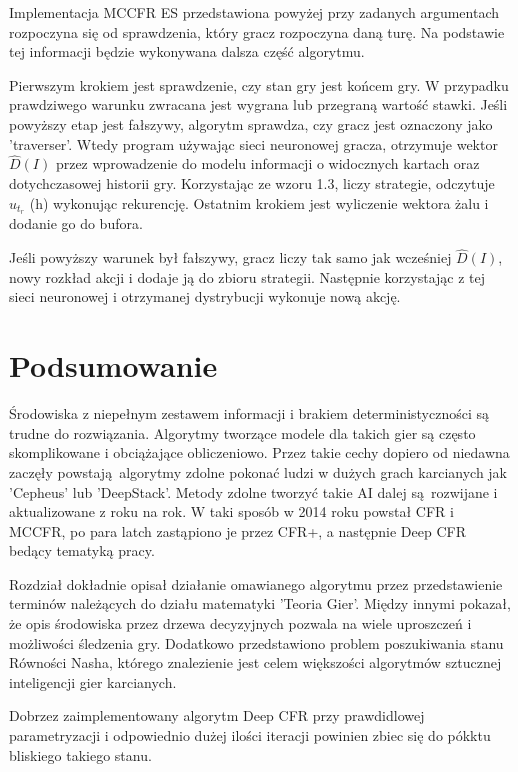 \documentclass[12pt,oneside,a4paper]{report}
\begin{document}
\vspace{1cm}

Implementacja MCCFR ES przedstawiona powyżej przy zadanych argumentach rozpoczyna się od
sprawdzenia, który gracz rozpoczyna daną turę. Na podstawie tej informacji będzie wykonywana
dalsza część algorytmu.


Pierwszym krokiem jest sprawdzenie, czy stan gry jest końcem gry. W przypadku prawdziwego 
warunku zwracana jest wygrana lub przegraną wartość stawki. 
Jeśli powyższy etap jest fałszywy, algorytm sprawdza, czy gracz jest oznaczony jako 'traverser'.
Wtedy program używając sieci neuronowej gracza,
otrzymuje wektor $\hat{D}(I)$ przez wprowadzenie do modelu informacji o widocznych kartach oraz
dotychczasowej historii gry. Korzystając ze wzoru 1.3, liczy strategie, odczytuje $u_{t_{r}}$ (h) 
wykonując rekurencję. Ostatnim krokiem jest wyliczenie wektora żalu i dodanie go do bufora.

Jeśli powyższy warunek był fałszywy, gracz liczy tak samo jak wcześniej $\hat{D}(I)$, nowy rozkład
akcji i dodaje ją do zbioru strategii. Następnie korzystając z tej sieci neuronowej i otrzymanej 
dystrybucji wykonuje nową akcję.


\section{Podsumowanie}

Środowiska z niepełnym zestawem informacji i brakiem deterministyczności są trudne do rozwiązania.
Algorytmy tworzące modele
dla takich gier są często skomplikowane i obciążające obliczeniowo. 
Przez takie cechy dopiero od niedawna zaczęły powstają algorytmy zdolne pokonać ludzi w 
dużych grach karcianych jak 'Cepheus' lub 'DeepStack'. 
Metody zdolne tworzyć takie AI dalej są rozwijane i aktualizowane z roku na rok.
W taki sposób w 2014 roku powstał CFR i MCCFR, po para latch zastąpiono je przez CFR+, a 
następnie
Deep CFR bedący tematyką pracy. 

Rozdział dokładnie opisał działanie omawianego algorytmu
przez przedstawienie terminów należących do działu matematyki 'Teoria Gier'. Między innymi
 pokazał, że opis środowiska przez drzewa decyzyjnych pozwala na wiele uproszczeń i możliwości
 śledzenia gry. Dodatkowo przedstawiono problem poszukiwania stanu Równości Nasha, którego
 znalezienie jest celem większości algorytmów sztucznej inteligencji gier karcianych.

Dobrzez zaimplementowany algorytm Deep CFR przy prawdidlowej parametryzacji i odpowiednio dużej
ilości iteracji powinien zbiec się do pókktu bliskiego takiego stanu.
\end{document}
